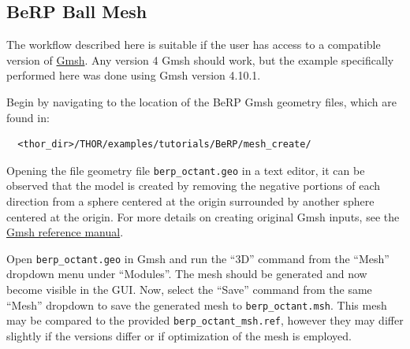 \subsection{BeRP Ball Mesh}\label{ch:tuts:sec:berp:ssec:mesh}

The workflow described here is suitable if the user has access to a compatible version of \href{https://gmsh.info/}{Gmsh}.
Any version 4 Gmsh should work, but the example specifically performed here was done using Gmsh version 4.10.1.

Begin by navigating to the location of the BeRP Gmsh geometry files, which are found in:
\begin{verbatim}
  <thor_dir>/THOR/examples/tutorials/BeRP/mesh_create/
\end{verbatim}
Opening the file geometry file \verb"berp_octant.geo" in a text editor, it can be observed that the model is created by removing the negative portions of each direction from a sphere centered at the origin surrounded by another sphere centered at the origin.
For more details on creating original Gmsh inputs, see the \href{https://gmsh.info/doc/texinfo/gmsh.html}{Gmsh reference manual}.

Open \verb"berp_octant.geo" in Gmsh and run the ``3D'' command from the ``Mesh'' dropdown menu under ``Modules''.
The mesh should be generated and now become visible in the \ac{GUI}.
Now, select the ``Save'' command from the same ``Mesh'' dropdown to save the generated mesh to \verb"berp_octant.msh".
This mesh may be compared to the provided \verb"berp_octant_msh.ref", however they may differ slightly if the versions differ or if optimization of the mesh is employed.

